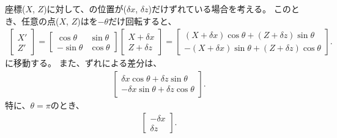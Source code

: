 




\TableCenter 座標($X$, $Z$)に対して、\JigCenter の位置が($\delta x$, $\delta z$)だけずれている場合を考える。
このとき、任意の点($X$, $Z$)は\Table を$-\theta$だけ回転すると、
\begin{align*}
  \left[
    \begin{array}{c}
      X'\\
      Z'
    \end{array}
  \right]
  = \left[
    \begin{array}{cc}
      \cos\theta & \sin\theta\\
      -\sin\theta & \cos\theta
    \end{array}
  \right]\!\!
  \left[
    \begin{array}{c}
      X+\delta x\\
      Z+\delta z
    \end{array}
  \right]
  = \left[
    \begin{array}{c}
      (X+\delta x)\cos\theta+(Z+\delta z)\sin\theta\\
      -(X+\delta x)\sin\theta+(Z+\delta z)\cos\theta
    \end{array}
  \right].
\end{align*}
に移動する。
また、ずれによる差分は、
\begin{align*}
  \left[
    \begin{array}{c}
      \delta x\cos\theta+\delta z\sin\theta\\
      -\delta x\sin\theta+\delta z\cos\theta
    \end{array}
  \right].
\end{align*}
特に、$\theta = \pi$のとき、
\begin{align*}
  \left[
    \begin{array}{c}
      -\delta x\\
      \delta z
    \end{array}
  \right].
\end{align*}


